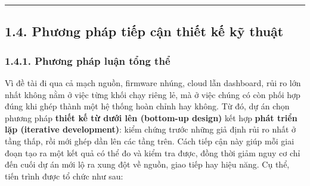 \documentclass[a4paper]{extarticle}
\begin{document}
\begin{center}\rule{0.5\linewidth}{0.5pt}\end{center}

\subsection{1.4. Phương pháp tiếp cận thiết kế kỹ
thuật}\label{14-phux1b0ux1a1ng-phuxe1p-tiux1ebfp-cux1eadn-thiux1ebft-kux1ebf-kux1ef9-thuux1eadt}

\subsubsection{1.4.1. Phương pháp luận tổng
thể}\label{141-phux1b0ux1a1ng-phuxe1p-luux1eadn-tux1ed5ng-thux1ec3}

Vì đề tài đi qua cả mạch nguồn, firmware nhúng, cloud lẫn dashboard, rủi
ro lớn nhất không nằm ở việc từng khối chạy riêng lẻ, mà ở việc chúng có
còn phối hợp đúng khi ghép thành một hệ thống hoàn chỉnh hay không. Từ
đó, dự án chọn phương pháp \textbf{thiết kế từ dưới lên (bottom-up
design)} kết hợp \textbf{phát triển lặp (iterative development)}: kiểm
chứng trước những giả định rủi ro nhất ở tầng thấp, rồi mới ghép dần lên
các tầng trên. Cách tiếp cận này giúp mỗi giai đoạn tạo ra một kết quả
có thể đo và kiểm tra được, đồng thời giảm nguy cơ chỉ đến cuối dự án
mới lộ ra xung đột về nguồn, giao tiếp hay hiệu năng. Cụ thể, tiến trình
được tổ chức như sau:
\end{document}
